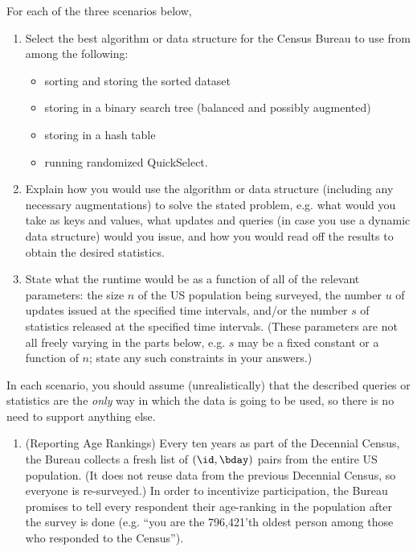 \documentclass[11pt]{article}
\begin{document}
\begin{enumerate}
    For each of the three scenarios below, 
    \begin{enumerate}
        \item Select the best algorithm or data structure for the Census Bureau to use from among the following: 
        \begin{itemize}
            \item sorting and storing the sorted dataset 
            \item storing in a binary search tree (balanced and possibly augmented)
            \item storing in a hash table
            \item running randomized QuickSelect. 
        \end{itemize}
        \item Explain how you would use the
        algorithm or data structure (including any necessary augmentations) to solve the stated problem, e.g. what would you take as keys and values, what updates and queries (in case you use a dynamic data structure) would you issue, and how you would read off the results to obtain the desired statistics. 
        \item State what the runtime would be as a function of all of the relevant parameters: the size $n$ of the US population being surveyed, the number $u$ of updates issued at the specified time intervals, and/or the number $s$ of statistics released at the specified time intervals.     (These parameters are not all freely varying in the parts below, e.g. $s$ may be a fixed constant or a function of $n$; state any such constraints in your answers.) 
    \end{enumerate}
    In each scenario, you should assume (unrealistically) that the described queries or statistics are the {\em only} way in which the data is going to be used, so there is no need to support anything else.
        
\begin{enumerate}
\item (Reporting Age Rankings)
Every ten years as part of the Decennial Census, the Bureau collects a fresh list of $(\id,\bday)$ pairs from the entire US population.
(It does not reuse data from the previous Decennial Census, so everyone is re-surveyed.)
In order to incentivize participation, the Bureau promises to tell every respondent their age-ranking in the population after the survey is done (e.g. ``you are the 796,421'th oldest person among those who responded to the Census'').


\end{enumerate}
\end{enumerate}
\end{document}
